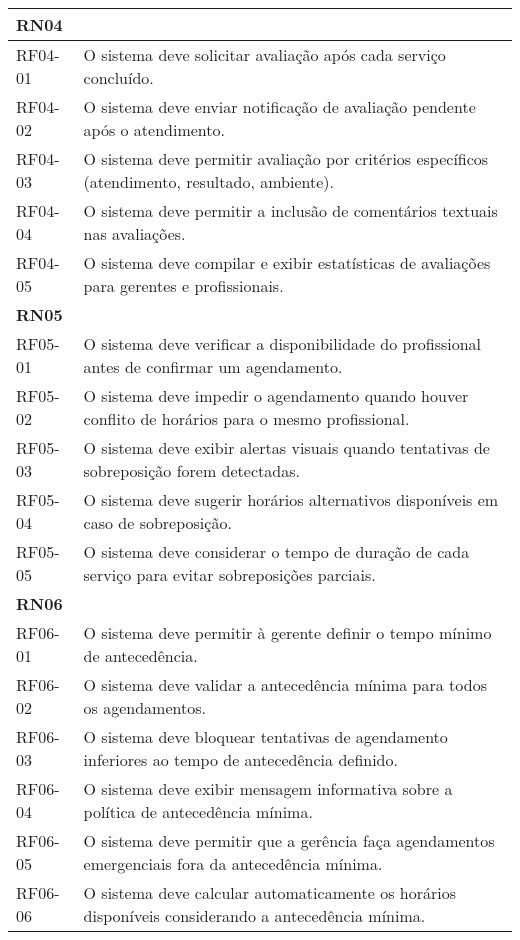 \begin{longtable}{|p{}|p{}|}
	\multicolumn{2}{|l|}{\textbf{RN04}} \\ \hline
	RF04-01 & O sistema deve solicitar avaliação após cada serviço concluído. \\ \hline
	RF04-02 & O sistema deve enviar notificação de avaliação pendente após o atendimento. \\ \hline
	RF04-03 & O sistema deve permitir avaliação por critérios específicos (atendimento, resultado, ambiente). \\ \hline
	RF04-04 & O sistema deve permitir a inclusão de comentários textuais nas avaliações. \\ \hline
	RF04-05 & O sistema deve compilar e exibir estatísticas de avaliações para gerentes e profissionais. \\ \hline
	
	\multicolumn{2}{|l|}{\textbf{RN05}} \\ \hline
	RF05-01 & O sistema deve verificar a disponibilidade do profissional antes de confirmar um agendamento. \\ \hline
	RF05-02 & O sistema deve impedir o agendamento quando houver conflito de horários para o mesmo profissional. \\ \hline
	RF05-03 & O sistema deve exibir alertas visuais quando tentativas de sobreposição forem detectadas. \\ \hline
	RF05-04 & O sistema deve sugerir horários alternativos disponíveis em caso de sobreposição. \\ \hline
	RF05-05 & O sistema deve considerar o tempo de duração de cada serviço para evitar sobreposições parciais. \\ \hline
	
	\multicolumn{2}{|l|}{\textbf{RN06}} \\ \hline
	RF06-01 & O sistema deve permitir à gerente definir o tempo mínimo de antecedência. \\ \hline
	RF06-02 & O sistema deve validar a antecedência mínima para todos os agendamentos. \\ \hline
	RF06-03 & O sistema deve bloquear tentativas de agendamento inferiores ao tempo de antecedência definido. \\ \hline
	RF06-04 & O sistema deve exibir mensagem informativa sobre a política de antecedência mínima. \\ \hline
	RF06-05 & O sistema deve permitir que a gerência faça agendamentos emergenciais fora da antecedência mínima. \\ \hline
	RF06-06 & O sistema deve calcular automaticamente os horários disponíveis considerando a antecedência mínima. \\ \hline
	

\end{longtable}
